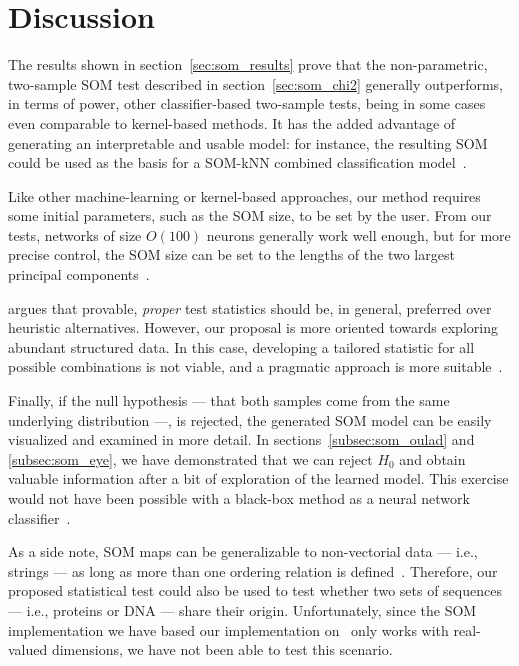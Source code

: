 \section{Discussion}
\label{sec:som_discussion}
The results shown in section~\ref{sec:som_results} prove that the non-parametric,
two-sample \gls{SOM} test described in section~\ref{sec:som_chi2} generally outperforms,
in terms of power, other classifier-based two-sample tests, being in some cases even
comparable to kernel-based methods. It has the added advantage of generating an
interpretable and usable model: for instance, the resulting \gls{SOM} could be used
as the basis for a SOM-kNN combined classification model~\cite{silva2011som}.

Like other machine-learning or kernel-based approaches, our method requires some
initial parameters, such as the \gls{SOM}  size, to be set by the user. From our
tests, networks of size $O(100)$ neurons generally work well enough, but for more
precise control, the \gls{SOM} size can be set to the lengths of the two largest
principal components~\cite{KOHONEN201352}.

\cite{rosenblatt2021better} argues that provable, \emph{proper} test statistics
should be, in general, preferred over heuristic alternatives. However, our
proposal is more oriented towards exploring abundant structured data. In this
case, developing a tailored statistic for all possible combinations is not viable,
and a pragmatic approach is more suitable~\cite{kim2021classification}.

Finally, if the null hypothesis --- that both samples come from the same underlying
distribution ---, is rejected, the generated \gls{SOM}  model can be easily visualized
and examined in more detail.
In sections~\ref{subsec:som_oulad} and \ref{subsec:som_eye}, we have demonstrated
that we can reject $H_0$ and obtain valuable information after a bit of exploration
of the learned model. This exercise would not have been possible with a black-box
method as a neural network classifier~\cite{friedman2004multivariate}.


As a side note, \gls{SOM}  maps can be generalizable to non-vectorial data
--- i.e., strings --- as long as more than one ordering relation is defined~\cite{kohonen1982self, KOHONEN201352}.
Therefore, our proposed statistical test could also be used to test whether
two sets of sequences --- i.e., proteins or DNA --- share their origin.
Unfortunately, since the \gls{SOM}  implementation we have based our implementation
on~\cite{wittek2013somoclu} only works with real-valued dimensions, we have not been
able to test this scenario.



